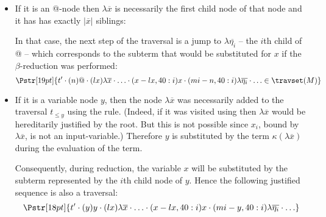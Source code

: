     \begin{itemize}
    \item If it is an @-node then $\lambda \overline{x}$ is necessarily the first child node of that node
    and it has has exactly $|\overline{x}|$ siblings:
\begin{center}
\end{center}

    In that case, the next step of the traversal is a jump to $\lambda \overline{\eta_i}$ -- the $i$th child of
    @ -- which corresponds to the subterm that would be substituted for $x$ if the $\beta$-reduction was
    performed:
    $$\Pstr[19pt]{ t' \cdot
            (n){@} \cdot
            (lx){\lambda \overline{x}} \cdot \ldots \cdot
            (x-lx,40:i){x} \cdot
            (mi-n,40:i){\lambda \overline{\eta_i}} \cdot \ldots
            \in {\travset(M)}   }
    $$

    \item If it is a variable node $y$, then
    the node $\lambda \overline{x}$ was necessarily added to the traversal $t_{\leq y}$ using the  rule.
    (Indeed, if it was visited using  then $\lambda \overline{x}$ would be hereditarily justified by the root. But this is not possible since $x_i$, bound by $\lambda \overline{x}$, is not an input-variable.)
    Therefore $y$ is substituted by the term $\kappa(\lambda \overline{x})$ during the evaluation of the term.

    Consequently, during reduction, the variable $x$ will be substituted by the subterm represented by
    the $i$th child node of $y$. Hence the following justified sequence is also a traversal:
    $$\Pstr[18pt]{ t' \cdot
            (y){y} \cdot
            (lx){\lambda \overline{x}} \cdot \ldots \cdot
            (x-lx,40:i){x} \cdot
            (mi-y,40:i){\lambda \overline{\eta_i}} \cdot \ldots
    }
    $$
    \end{itemize}

